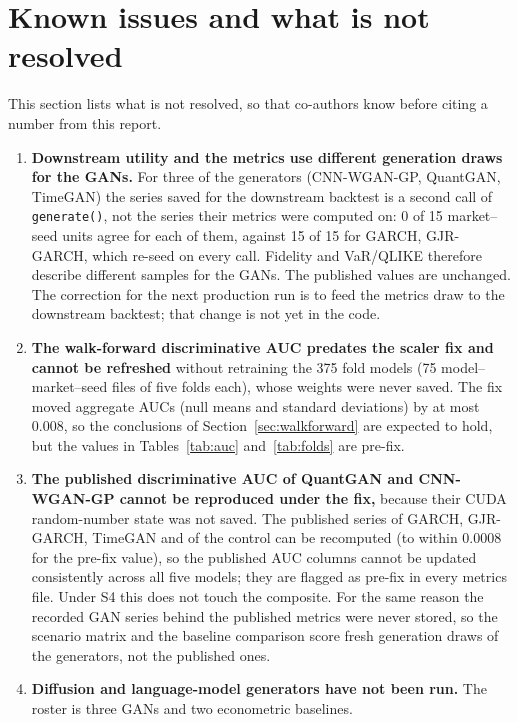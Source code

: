 \documentclass[11pt,a4paper]{article}
\makeatletter
\DeclareRobustCommand{\_}{\ifmmode\nfss@text{\textunderscore}\else\textunderscore\allowbreak\fi}
\makeatother
\begin{document}
\section{Known issues and what is not resolved}
\label{sec:issues}
\begin{tcolorbox}[sharp corners,boxrule=0.5pt,colframe=Rule,colback=white,left=8pt,right=8pt,top=6pt,bottom=6pt]
This section lists what is not resolved, so that co-authors know before citing a number from this report.
\end{tcolorbox}
\begin{enumerate}[leftmargin=1.6em,itemsep=6pt]
\item \textbf{Downstream utility and the metrics use different generation draws for the GANs.} For three of the generators (CNN-WGAN-GP, QuantGAN, TimeGAN) the series saved for the downstream backtest is a second call of \texttt{generate()}, not the series their metrics were computed on: 0 of 15 market--seed units agree for each of them, against 15 of 15 for GARCH, GJR-GARCH, which re-seed on every call. Fidelity and VaR/QLIKE therefore describe different samples for the GANs. The published values are unchanged. The correction for the next production run is to feed the metrics draw to the downstream backtest; that change is not yet in the code.
\item \textbf{The walk-forward discriminative AUC predates the scaler fix and cannot be refreshed} without retraining the 375 fold models (75 model--market--seed files of five folds each), whose weights were never saved. The fix moved aggregate AUCs (null means and standard deviations) by at most 0.008, so the conclusions of Section~\ref{sec:walkforward} are expected to hold, but the values in Tables~\ref{tab:auc} and~\ref{tab:folds} are pre-fix.
\item \textbf{The published discriminative AUC of QuantGAN and CNN-WGAN-GP cannot be reproduced under the fix,} because their CUDA random-number state was not saved. The published series of GARCH, GJR-GARCH, TimeGAN and of the control can be recomputed (to within 0.0008 for the pre-fix value), so the published AUC columns cannot be updated consistently across all five models; they are flagged as pre-fix in every metrics file. Under S4 this does not touch the composite. For the same reason the recorded GAN series behind the published metrics were never stored, so the scenario matrix and the baseline comparison score fresh generation draws of the generators, not the published ones.
\item \textbf{Diffusion and language-model generators have not been run.} The roster is three GANs and two econometric baselines.

\end{enumerate}
\end{document}
